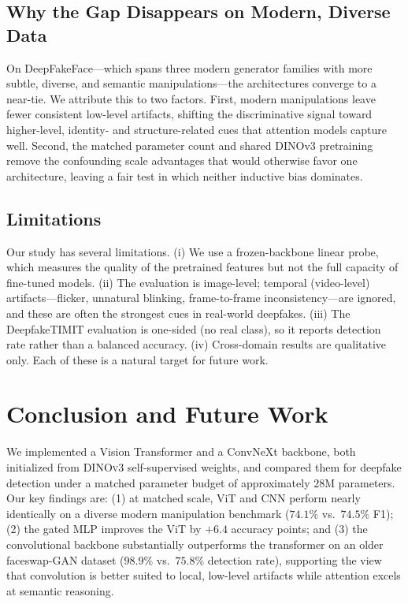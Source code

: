 \documentclass[11pt,a4paper]{article}
\begin{document}
\subsection{Why the Gap Disappears on Modern, Diverse Data}
On DeepFakeFace---which spans three modern generator families with more subtle, diverse, and
semantic manipulations---the architectures converge to a near-tie. We attribute this to two
factors. First, modern manipulations leave fewer consistent low-level artifacts, shifting the
discriminative signal toward higher-level, identity- and structure-related cues that attention
models capture well. Second, the matched parameter count and shared DINOv3 pretraining remove the
confounding scale advantages that would otherwise favor one architecture, leaving a fair test in
which neither inductive bias dominates.

\subsection{Limitations}
Our study has several limitations. (i) We use a frozen-backbone linear probe, which measures the
quality of the pretrained features but not the full capacity of fine-tuned models. (ii) The
evaluation is image-level; temporal (video-level) artifacts---flicker, unnatural blinking,
frame-to-frame inconsistency---are ignored, and these are often the strongest cues in real-world
deepfakes. (iii) The DeepfakeTIMIT evaluation is one-sided (no real class), so it reports detection
rate rather than a balanced accuracy. (iv) Cross-domain results are qualitative only. Each of
these is a natural target for future work.

\section{Conclusion and Future Work}
We implemented a Vision Transformer and a ConvNeXt backbone, both initialized from \textsc{DINOv3}
self-supervised weights, and compared them for deepfake detection under a matched parameter budget
of approximately $28$M parameters. Our key findings are: (1) at matched scale, ViT and CNN perform
nearly identically on a diverse modern manipulation benchmark ($74.1\%$ vs.\ $74.5\%$ F1);
(2) the gated MLP improves the ViT by $+6.4$ accuracy points; and (3) the convolutional backbone
substantially outperforms the transformer on an older faceswap-GAN dataset ($98.9\%$ vs.\ $75.8\%$
detection rate), supporting the view that convolution is better suited to local, low-level
artifacts while attention excels at semantic reasoning.
\end{document}
